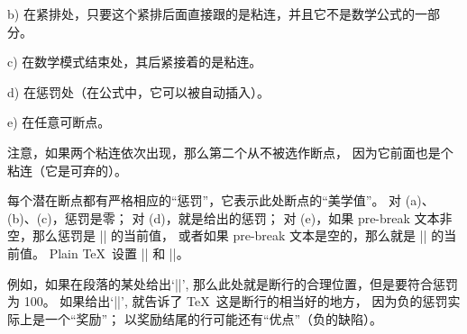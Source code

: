 \smallskip
\item{b)} 在紧排处，只要这个紧排后面直接跟的是粘连，并且它不是数学公式的一部分。

\smallskip
\item{c)} 在数学模式结束处，其后紧接着的是粘连。

\smallskip
\item{d)} 在惩罚处（在公式中，它可以被自动插入）。

\smallskip
\item{e)} 在任意可断点。

\smallskip\noindent
注意，如果两个粘连依次出现，那么第二个从不被选作断点，
因为它前面也是个粘连（它是可弃的）。

\danger 每个潜在断点都有严格相应的``惩罚''，它表示此处断点的``美学值''。
对 (a)、(b)、(c)，惩罚是零；
对 (d)，就是给出的惩罚；
对 (e)，如果 pre-break 文本非空，那么惩罚是 |\hyphenpenalty| 的当前值，
或者如果 pre-break 文本是空的，那么就是 |\exhyphenpenalty| 的当前值。
Plain \TeX\ 设置 || 和 ||。

\danger \1例如，如果在段落的某处给出`||',
那么此处就是断行的合理位置，但是要符合惩罚为 100。%
如果给出`\hbox{||}', 就告诉了 \TeX\ 这是断行的相当好的地方，
因为负的惩罚实际上是一个``奖励''；
以奖励结尾的行可能还有``优点''（负的缺陷）。

